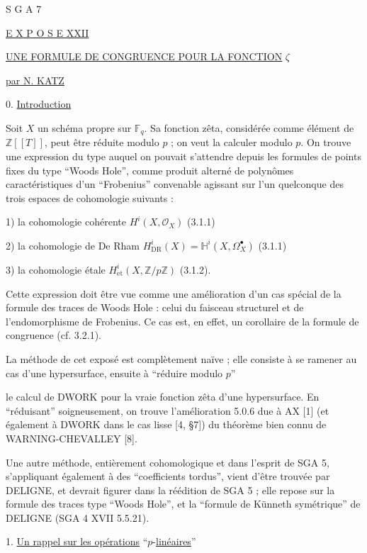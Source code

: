 
S G A  7


\underline{E X P O S E  XXII}


\underline{\underline{UNE FORMULE DE CONGRUENCE POUR LA FONCTION}} $\zeta$

\underline{par N. KATZ}


0. \underline{Introduction}

Soit $X$ un schéma propre sur $\mathbb F_q$. Sa fonction zêta, considérée
comme élément de $\mathbb Z[[T]]$, peut être réduite modulo $p$ ; on veut la
calculer modulo $p$. On trouve une expression du type auquel on pouvait
s'attendre depuis les formules de points fixes du type ``Woods Hole'', comme
produit alterné de polynômes caractéristiques d'un ``Frobenius'' convenable
agissant sur l'un quelconque des trois espaces de cohomologie suivants :

1) la cohomologie cohérente $H^i(X,\mathcal O_X)$ (3.1.1)

2) la cohomologie de De Rham
$H^i_{\mathrm{DR}}(X)=\mathbb H^i(X,\Omega_X^\bullet)$ (3.1.1)

3) la cohomologie étale
$H^i_{\mathrm{et}}(X,\mathbb Z/p\mathbb Z)$ (3.1.2).

Cette expression doit être vue comme une amélioration d'un cas spécial de la
formule des traces de Woods Hole : celui du faisceau structurel et de
l'endomorphisme de Frobenius. Ce cas est, en effet, un corollaire de la
formule de congruence (cf. 3.2.1).

La méthode de cet exposé est complètement naïve ; elle consiste à se ramener
au cas d'une hypersurface, ensuite à ``réduire modulo $p$''


le calcul de DWORK pour la vraie fonction zêta d'une hypersurface. En
``réduisant'' soigneusement, on trouve l'amélioration 5.0.6 due à AX [1]
(et également à DWORK dans le cas lisse [4, \S 7]) du théorème bien connu de
WARNING-CHEVALLEY [8].

Une autre méthode, entièrement cohomologique et dans l'esprit de SGA 5,
s'appliquant également à des ``coefficients tordus'', vient d'être trouvée par
DELIGNE, et devrait figurer dans la réédition de SGA 5 ; elle repose sur la
formule des traces type ``Woods Hole'', et la ``formule de Künneth symétrique''
de DELIGNE (SGA 4 XVII 5.5.21).

1. \underline{Un rappel sur les opérations} ``$p$-\underline{linéaires}''

